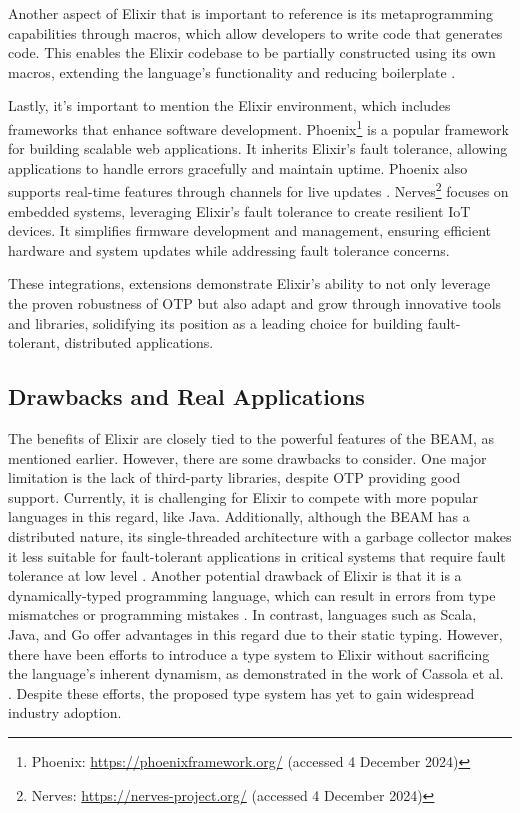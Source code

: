 Another aspect of Elixir that is important to reference is its metaprogramming capabilities through macros, which allow developers to write code that generates code. This enables the Elixir codebase to be partially constructed using its own macros, extending the language's functionality and reducing boilerplate \cite{Juric2024}.

Lastly, it's important to mention the Elixir environment, which includes frameworks that enhance software development. Phoenix\footnote{Phoenix: \url{https://phoenixframework.org/} (accessed 4 December 2024)} is a popular framework for building scalable web applications. It inherits Elixir's fault tolerance, allowing applications to handle errors gracefully and maintain uptime. Phoenix also supports real-time features through channels for live updates \cite{Juric2024}. Nerves\footnote{Nerves: \url{https://nerves-project.org/} (accessed 4 December 2024)} focuses on embedded systems, leveraging Elixir's fault tolerance to create resilient IoT devices. It simplifies firmware development and management, ensuring efficient hardware and system updates while addressing fault tolerance concerns.

These integrations, extensions  demonstrate Elixir’s ability to not only leverage the proven robustness of \gls{OTP} but also adapt and grow through innovative tools and libraries, solidifying its position as a leading choice for building fault-tolerant, distributed applications.

\subsection{Drawbacks and Real Applications}

The benefits of Elixir are closely tied to the powerful features of the \gls{BEAM}, as mentioned earlier. However, there are some drawbacks to consider. One major limitation is the lack of third-party libraries, despite \gls{OTP} providing good support. Currently, it is challenging for Elixir to compete with more popular languages in this regard, like Java. Additionally, although the \gls{BEAM} has a distributed nature, its single-threaded architecture with a garbage collector makes it less suitable for fault-tolerant applications in critical systems that require fault tolerance at low level \cite{Juric2024}. Another potential drawback of Elixir is that it is a dynamically-typed programming language, which can result in errors from type mismatches or programming mistakes \cite{Cassola2020}. In contrast, languages such as Scala, Java, and Go offer advantages in this regard due to their static typing. However, there have been efforts to introduce a type system to Elixir without sacrificing the language's inherent dynamism, as demonstrated in the work of Cassola et al. \cite{Cassola2020}. Despite these efforts, the proposed type system has yet to gain widespread industry adoption.

